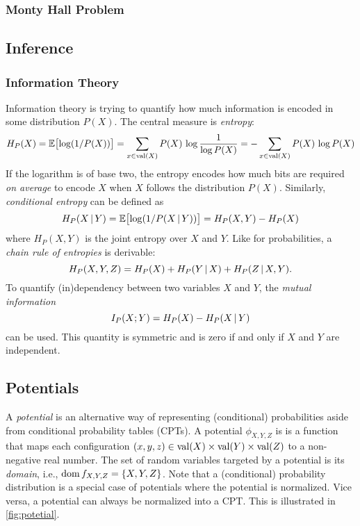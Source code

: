 			\subsubsection{Monty Hall Problem} %

		\subsection{Inference} %

			\subsubsection{Information Theory}
				Information theory is trying to quantify how much information is encoded in some distribution \(P(X)\). The central measure is \emph{entropy}:
				\begin{equation}
					H_P(X)
						= \mathbb{E}\bigl[ \log(1/P(X)) \bigr]
						= \sum_{x \in \operatorname{val}(X)} P(X) \,\log \frac{1}{\log P(X)}
						= -\sum_{x \in \operatorname{val}(X)} P(X) \,\log P(X)
				\end{equation}
				If the logarithm is of base two, the entropy encodes how much bits are required \emph{on average} to encode \(X\) when \(X\) follows the distribution \(P(X)\). Similarly, \emph{conditional entropy} can be defined as
				\begin{equation}
					H_P(X \,\vert\, Y)
						= \mathbb{E}\bigl[ \log(1/P(X \,\vert\, Y)) \bigr]
						= H_P(X, Y) - H_P(X)
				\end{equation}
				where \( H_P(X, Y) \) is the joint entropy over \(X\) and \(Y\). Like for probabilities, a \emph{chain rule of entropies} is derivable:
				\begin{equation}
					H_P(X, Y, Z) = H_P(X) + H_P(Y \,\vert\, X) + H_P(Z \,\vert\, X, Y).
				\end{equation}
				To quantify (in)dependency between two variables \(X\) and \(Y\), the \emph{mutual information}
				\begin{equation}
					I_P(X; Y) = H_P(X) - H_P(X \,\vert\, Y)
				\end{equation}
				can be used. This quantity is symmetric and is zero if and only if \(X\) and \(Y\) are independent.

		\subsection{Potentials}
			A \emph{potential} is an alternative way of representing (conditional) probabilities aside from conditional probability tables (CPTs). A potential \(\phi_{X, Y, Z}\) is is a function that maps each configuration \( (x, y, z) \in \operatorname{val}(X) \times \operatorname{val}(Y) \times \operatorname{val}(Z) \) to a non-negative real number. The set of random variables targeted by a potential is its \emph{domain}, i.e., \( \operatorname{dom} f_{X, Y, Z} = \{ X, Y, Z \} \). Note that a (conditional) probability distribution is a special case of potentials where the potential is normalized. Vice versa, a potential can always be normalized into a CPT. This is illustrated in \autoref{fig:potetial}.


